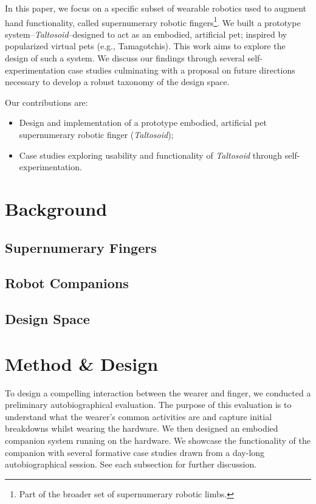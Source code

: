 \documentclass[letterpaper, 10 pt, conference]{ieeeconf}  %
\begin{document}
In this paper, we focus on a specific subset of wearable robotics used to augment hand functionality, called supernumerary robotic fingers\footnote{Part of the broader set of supernumerary robotic limbs.}. We built a prototype system--\textit{Taltosoid}--designed to act as an embodied, artificial pet; inspired by popularized virtual pets (e.g., Tamagotchis). This work aims to explore the design of such a system. We discuss our findings through several self-experimentation case studies culminating with a proposal on future directions necessary to develop a robust taxonomy of the design space.

Our contributions are:
\begin{itemize}
    \item Design and implementation of a prototype embodied, artificial pet supernumerary robotic finger (\textit{Taltosoid});
    \item Case studies exploring usability and functionality of \textit{Taltosoid} through self-experimentation.
\end{itemize}


\section{Background}

\subsection{Supernumerary Fingers}

\subsection{Robot Companions}

\subsection{Design Space}


\section{Method \& Design}
To design a compelling interaction between the wearer and finger, we conducted a preliminary autobiographical evaluation. The purpose of this evaluation is to understand what the wearer's common activities are and capture initial breakdowns whilst wearing the hardware. We then designed an embodied companion system running on the hardware. We showcase the functionality of the companion with several formative case studies drawn from a day-long autobiographical session. See each subsection for further discussion.
\end{document}
